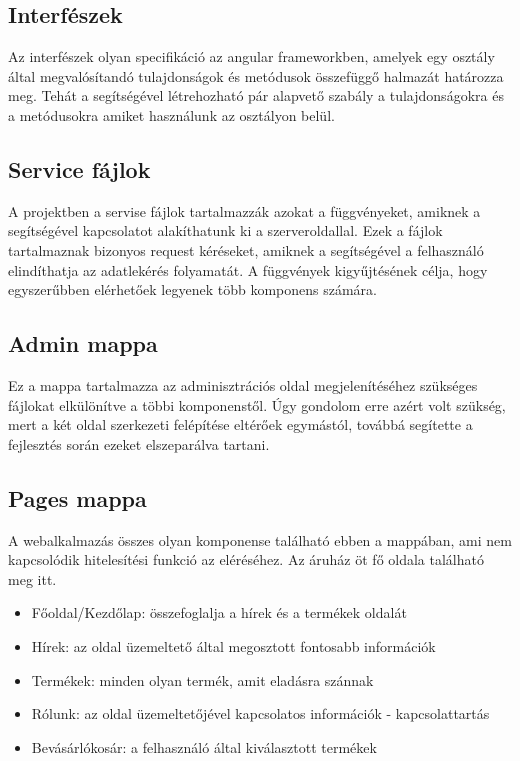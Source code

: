 \subsection{Interfészek}
Az interfészek olyan specifikáció az angular frameworkben, amelyek egy osztály által megvalósítandó tulajdonságok és metódusok összefüggő halmazát határozza meg. Tehát a segítségével létrehozható pár alapvető szabály a tulajdonságokra és a metódusokra amiket használunk az osztályon belül.

\subsection{Service fájlok}
A projektben a servise fájlok tartalmazzák azokat a függvényeket, amiknek a segítségével kapcsolatot alakíthatunk ki a szerveroldallal. Ezek a fájlok tartalmaznak bizonyos request kéréseket, amiknek a segítségével a felhasználó elindíthatja az adatlekérés folyamatát. A függvények kigyűjtésének célja, hogy egyszerűbben elérhetőek legyenek több komponens számára.

\subsection{Admin mappa}
Ez a mappa tartalmazza az adminisztrációs oldal megjelenítéséhez szükséges fájlokat elkülönítve a többi komponenstől. Úgy gondolom erre azért volt szükség, mert a két oldal szerkezeti felépítése eltérőek egymástól, továbbá segítette a fejlesztés során ezeket elszeparálva tartani.

\subsection{Pages mappa}
A webalkalmazás összes olyan komponense található ebben a mappában, ami nem kapcsolódik hitelesítési funkció az eléréséhez. Az áruház öt fő oldala található meg itt.

\begin{itemize}
	\item Főoldal/Kezdőlap: összefoglalja a hírek és a termékek oldalát
	\item Hírek: az oldal üzemeltető által megosztott fontosabb információk
	\item Termékek: minden olyan termék, amit eladásra szánnak
	\item Rólunk: az oldal üzemeltetőjével kapcsolatos információk - kapcsolattartás
	\item Bevásárlókosár:  a felhasználó által kiválasztott termékek
\end{itemize}

